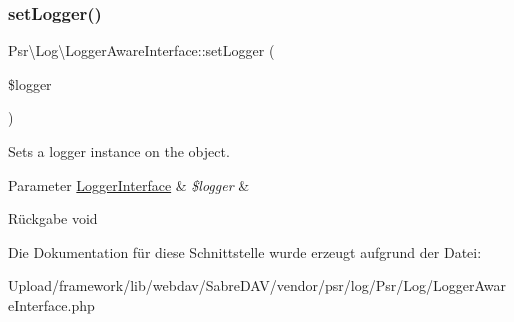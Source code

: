 \subsubsection{\texorpdfstring{set\+Logger()}{setLogger()}}
{\footnotesize\ttfamily Psr\textbackslash{}\+Log\textbackslash{}\+Logger\+Aware\+Interface\+::set\+Logger (\begin{DoxyParamCaption}\item[{\mbox{\hyperlink{interface_psr_1_1_log_1_1_logger_interface}{Logger\+Interface}}}]{\$logger }\end{DoxyParamCaption})}

Sets a logger instance on the object.


\begin{DoxyParams}[1]{Parameter}
\mbox{\hyperlink{interface_psr_1_1_log_1_1_logger_interface}{Logger\+Interface}} & {\em \$logger} & \\
\hline
\end{DoxyParams}
\begin{DoxyReturn}{Rückgabe}
void 
\end{DoxyReturn}


Die Dokumentation für diese Schnittstelle wurde erzeugt aufgrund der Datei\+:\begin{DoxyCompactItemize}
\item 
Upload/framework/lib/webdav/\+Sabre\+D\+A\+V/vendor/psr/log/\+Psr/\+Log/Logger\+Aware\+Interface.\+php\end{DoxyCompactItemize}
